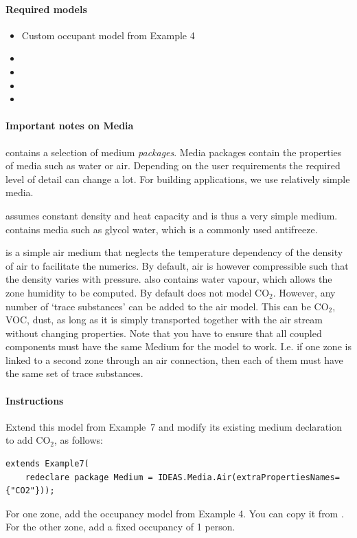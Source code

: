 \documentclass[10pt,a4paper]{article}
\begin{document}
\paragraph{Required models}
\begin{itemize}
\item Custom occupant model from Example 4
\item {}
\item {}
\item {}
\item {}
\end{itemize}


\paragraph{Important notes on Media}
 contains a selection of medium \textit{packages}. 
Media packages contain the properties of media such as water or air.
Depending on the user requirements the required level of detail can change a lot.
For building applications, we use relatively simple media.

 assumes constant density and heat capacity and is thus
a very simple medium.
 contains media such as glycol water,
which is a commonly used antifreeze.

 is a simple air medium that 
neglects the temperature dependency of the density of air to
facilitate the numerics. 
By default, air is however compressible such that the density
varies with pressure.
 also contains water vapour,
which allows the zone humidity to be computed.
By default  does not model CO$_2$.
However, any number of `trace substances' can be added to the air model.
This can be CO$_2$, VOC, dust, as long as it is simply transported together
with the air stream without changing properties.
Note that you have to ensure that all coupled components must have the same Medium
for the model to work. I.e. if one zone is linked to a second zone through an air connection,
then each of them must have the same set of trace substances.

\paragraph{Instructions}
Extend this model from Example~7 and modify its existing medium declaration
to add CO$_2$, as follows:
\begin{verbatim}
extends Example7(
    redeclare package Medium = IDEAS.Media.Air(extraPropertiesNames={"CO2"}));
\end{verbatim}
For one zone, add the occupancy model from Example 4. 
You can copy it from .
For the other zone, add a fixed occupancy of 1 person.
\end{document}
